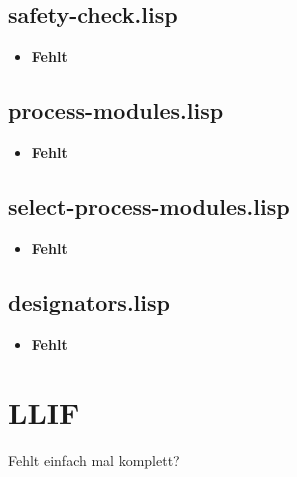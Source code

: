 \documentclass[main.tex]{subfiles}
\begin{document}
	    \subsection{safety-check.lisp}
	    \begin{itemize}
	    	\item \textbf{Fehlt} \\
	    \end{itemize}
	    \subsection{process-modules.lisp}
	    \begin{itemize}
	    	\item \textbf{Fehlt} \\
	    \end{itemize}
	    \subsection{select-process-modules.lisp}
	    \begin{itemize}
	    	\item \textbf{Fehlt} \\
	    \end{itemize}
	    \subsection{designators.lisp}
	    \begin{itemize}
	    	\item \textbf{Fehlt} \\
	    \end{itemize}

	  	\section{LLIF}
		Fehlt einfach mal komplett?
	\endgroup
\end{document}
